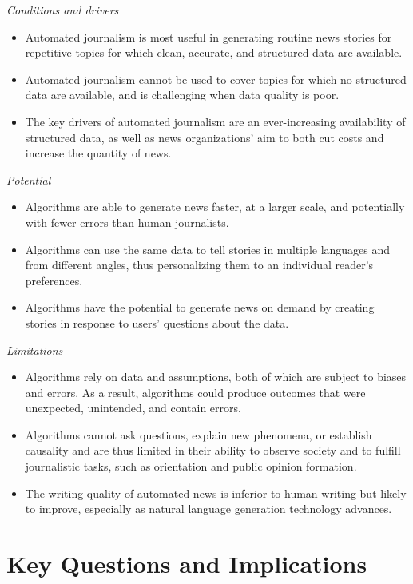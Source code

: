 \documentclass[notoc, symmetric, nobib, nols]{towcenter-book}
\begin{document}
\textit{Conditions and drivers}
\begin{itemize}
\item Automated journalism is most useful in generating routine news stories for repetitive topics for which clean, accurate, and structured data are available. 
\item Automated journalism cannot be used to cover topics for which no structured data are available, and is challenging when data quality is poor. 
\item The key drivers of automated journalism are an ever-increasing availability of structured data, as well as news organizations’ aim to both cut costs and increase the quantity of news.
\end{itemize}

\textit{Potential}
\begin{itemize}
\item Algorithms are able to generate news faster, at a larger scale, and potentially with fewer errors than human journalists. 
\item Algorithms can use the same data to tell stories in multiple languages and from different angles, thus personalizing them to an individual reader’s preferences. 
\item Algorithms have the potential to generate news on demand by creating stories in response to users’ questions about the data.
\end{itemize}

\textit{Limitations}
\begin{itemize}
\item Algorithms rely on data and assumptions, both of which are subject to biases and errors. As a result, algorithms could produce outcomes that were unexpected, unintended, and contain errors. 
\item Algorithms cannot ask questions, explain new phenomena, or establish causality and are thus limited in their ability to observe society and to fulfill journalistic tasks, such as orientation and public opinion formation. 
\item The writing quality of automated news is inferior to human writing but likely to improve, especially as natural language generation technology advances.
\end{itemize}

\section{Key Questions and Implications}
\end{document}
